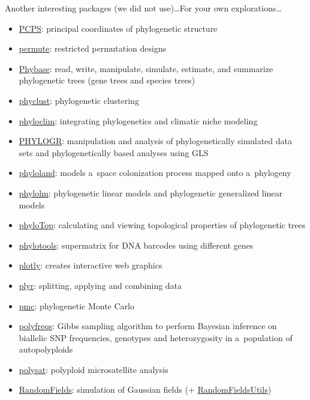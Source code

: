 \documentclass[compress, ucs, xelatex, 11pt, xcolor=svgnames,
	hyperref={
		bookmarks=true,
		unicode=true,
		colorlinks=true,
		pdftitle={Molecular data in R},
		plainpages=false,
		pdfauthor={Vojtech Zeisek},
		pdfsubject={Course about phylogeny and evolution in R},
		pdfcreator={XeLaTeX},
		pdfkeywords={R, evolution, phylogeny, molecular data},
		linkcolor=Tomato,
		anchorcolor=SaddleBrown,
		citecolor=Goldenrod,
		filecolor=DarkMagenta,
		menucolor=Sienna,
		urlcolor=DarkTurquoise,
		pdftex},
	url={hyphens, lowtilde} %
	]{beamer}
\begin{document}
\begin{frame}[allowframebreaks]{Another interesting packages (we did not use)\ldots}{For your own explorations\ldots}
\begin{itemize}
		\item \href{https://CRAN.R-project.org/package=PCPS}{PCPS}: principal coordinates of phylogenetic structure
		\item \href{https://CRAN.R-project.org/package=permute}{permute}: restricted permutation designs
		\item \href{https://github.com/bomeara/phybase}{Phybase}: read, write, manipulate, simulate, estimate, and summarize phylogenetic trees (gene trees and species trees)
		\item \href{https://CRAN.R-project.org/package=phyclust}{phyclust}: phylogenetic clustering
		\item \href{https://CRAN.R-project.org/package=phyloclim}{phyloclim}: integrating phylogenetics and climatic niche modeling
		\item \href{https://CRAN.R-project.org/package=PHYLOGR}{PHYLOGR}: manipulation and analysis of phylogenetically simulated data sets and phylogenetically based analyses using GLS
		\item \href{https://CRAN.R-project.org/package=phyloland}{phyloland}: models a~space colonization process mapped onto a~phylogeny
		\item \href{https://CRAN.R-project.org/package=phylolm}{phylolm}: phylogenetic linear models and phylogenetic generalized linear models
		\item \href{https://CRAN.R-project.org/package=phyloTop}{phyloTop}: calculating and viewing topological properties of phylogenetic trees
		\item \href{https://CRAN.R-project.org/package=phylotools}{phylotools}: supermatrix for DNA barcodes using different genes
		\item \href{https://CRAN.R-project.org/package=plotly}{plotly}: creates interactive web graphics
		\item \href{https://CRAN.R-project.org/package=plyr}{plyr}: splitting, applying and combining data
		\item \href{https://CRAN.R-project.org/package=pmc}{pmc}: phylogenetic Monte Carlo
		\item \href{https://CRAN.R-project.org/package=polyfreqs}{polyfreqs}: Gibbs sampling algorithm to perform Bayesian inference on biallelic SNP frequencies, genotypes and heterozygosity in a~population of autopolyploids
		\item \href{https://CRAN.R-project.org/package=polysat}{polysat}: polyploid microsatellite analysis
		\item \href{https://CRAN.R-project.org/package=RandomFields}{RandomFields}: simulation of Gaussian fields (+ \href{https://CRAN.R-project.org/package=RandomFieldsUtils}{RandomFieldsUtils})

\end{itemize}
\end{frame}
\end{document}
